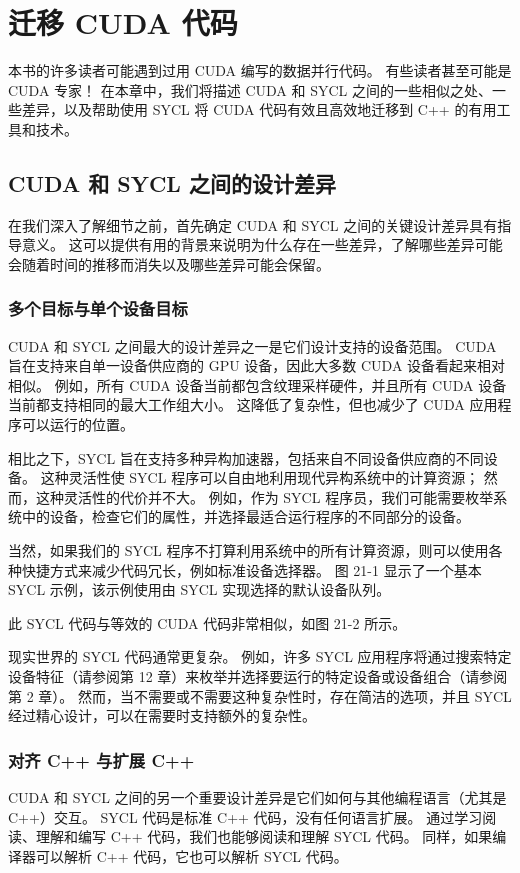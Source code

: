 \section{迁移 CUDA 代码}
本书的许多读者可能遇到过用 CUDA 编写的数据并行代码。 有些读者甚至可能是 CUDA 专家！ 在本章中，我们将描述 CUDA 和 SYCL 之间的一些相似之处、一些差异，以及帮助使用 SYCL 将 CUDA 代码有效且高效地迁移到 C++ 的有用工具和技术。

\subsection{CUDA 和 SYCL 之间的设计差异}
在我们深入了解细节之前，首先确定 CUDA 和 SYCL 之间的关键设计差异具有指导意义。 这可以提供有用的背景来说明为什么存在一些差异，了解哪些差异可能会随着时间的推移而消失以及哪些差异可能会保留。

\subsubsection{多个目标与单个设备目标}
CUDA 和 SYCL 之间最大的设计差异之一是它们设计支持的设备范围。 CUDA 旨在支持来自单一设备供应商的 GPU 设备，因此大多数 CUDA 设备看起来相对相似。 例如，所有 CUDA 设备当前都包含纹理采样硬件，并且所有 CUDA 设备当前都支持相同的最大工作组大小。 这降低了复杂性，但也减少了 CUDA 应用程序可以运行的位置。

相比之下，SYCL 旨在支持多种异构加速器，包括来自不同设备供应商的不同设备。 这种灵活性使 SYCL 程序可以自由地利用现代异构系统中的计算资源； 然而，这种灵活性的代价并不大。 例如，作为 SYCL 程序员，我们可能需要枚举系统中的设备，检查它们的属性，并选择最适合运行程序的不同部分的设备。

当然，如果我们的 SYCL 程序不打算利用系统中的所有计算资源，则可以使用各种快捷方式来减少代码冗长，例如标准设备选择器。 图 21-1 显示了一个基本 SYCL 示例，该示例使用由 SYCL 实现选择的默认设备队列。

此 SYCL 代码与等效的 CUDA 代码非常相似，如图 21-2 所示。

现实世界的 SYCL 代码通常更复杂。 例如，许多 SYCL 应用程序将通过搜索特定设备特征（请参阅第 12 章）来枚举并选择要运行的特定设备或设备组合（请参阅第 2 章）。 然而，当不需要或不需要这种复杂性时，存在简洁的选项，并且 SYCL 经过精心设计，可以在需要时支持额外的复杂性。

\subsubsection{对齐 C++ 与扩展 C++}
CUDA 和 SYCL 之间的另一个重要设计差异是它们如何与其他编程语言（尤其是 C++）交互。 SYCL 代码是标准 C++ 代码，没有任何语言扩展。 通过学习阅读、理解和编写 C++ 代码，我们也能够阅读和理解 SYCL 代码。 同样，如果编译器可以解析 C++ 代码，它也可以解析 SYCL 代码。

